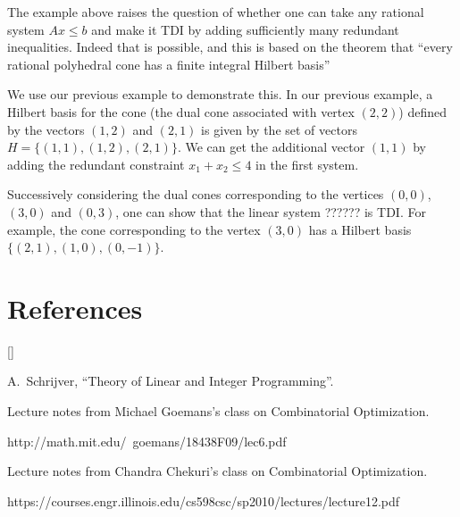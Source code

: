 \documentclass{article}
\def\beginrefs{\begin{list}%
        {[\arabic{equation}]}{\usecounter{equation}
         \setlength{\leftmargin}{2.0truecm}\setlength{\labelsep}{0.4truecm}%
         \setlength{\labelwidth}{1.6truecm}}}
\def\endrefs{\end{list}}
\def\bibentry#1{\item[\hbox{[#1]}]}
\begin{document}
The example above raises the question of whether one can take any rational system $Ax\leq b$ and make it TDI by adding sufficiently many redundant inequalities. Indeed that is possible, and this is based on the theorem that ``every rational polyhedral cone has a finite integral Hilbert basis''

We use our previous example to demonstrate this. In our previous example, a Hilbert basis for the cone (the dual cone associated with vertex $(2,2)$) defined by the vectors $(1,2)$ and $(2,1)$ is given by the set of vectors $H=\{(1,1),(1,2),(2,1)\}$. We can get the additional vector $(1,1)$ by adding the redundant constraint $x_1+x_2\leq 4$ in the first system.

Successively considering the dual cones corresponding to the vertices $(0,0)$, $(3,0)$ and $(0,3)$, one can show that the linear system ?????? is TDI. For example, the cone corresponding to the vertex $(3,0)$ has a Hilbert basis $\{(2,1),(1,0),(0,-1)\}$.

\section*{References}
\beginrefs
\bibentry{1}{\sc A.~Schrijver},
``Theory of Linear and Integer Programming''.
\bibentry{2}Lecture notes from Michael Goemans's class on Combinatorial Optimization. 

http://math.mit.edu/~goemans/18438F09/lec6.pdf

\bibentry{3}Lecture notes from Chandra Chekuri's class on Combinatorial Optimization.

https://courses.engr.illinois.edu/cs598csc/sp2010/lectures/lecture12.pdf

\endrefs

\end{document}
